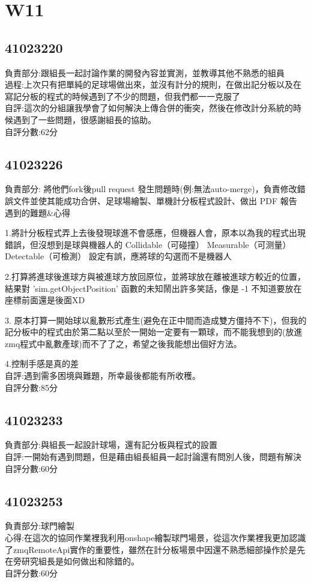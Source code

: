 \chapter{W11}


\section{41023220}

負責部分:跟組長一起討論作業的開發內容並實測，並教導其他不熟悉的組員\\過程:上次只有把單純的足球場做出來，並沒有計分的規則，在做出記分板以及在寫記分板的程式的時候遇到了不少的問題，但我們都一一克服了\\自評:這次的分組讓我學會了如何解決上傳合併的衝突，然後在修改計分系統的時候遇到了一些問題，很感謝組長的協助。\\自評分數:62分


\section{41023226}

負責部分: 將他們fork後pull request 發生問題時(例:無法auto-merge)，負責修改錯誤文件並使其能成功合併、足球場繪製、單機計分板程式設計、做出 PDF 報告\\遇到的難題&心得

1.將計分板程式弄上去後發現球進不會感應，但機器人會，原本以為我的程式出現錯誤，但沒想到是球與機器人的 Collidable（可碰撞） Measurable（可测量） Detectable（可檢測） 設定有誤，應將球的勾選而不是機器人

2.打算將進球後進球方與被進球方放回原位，並將球放在離被進球方較近的位置，結果對 'sim.getObjectPosition' 函數的未知鬧出許多笑話，像是 -1 不知道要放在座標前面還是後面XD

3. 原本打算一開始球以亂數形式產生(避免在正中間而造成雙方僵持不下)，但我的記分板中的程式由於第二點以至於一開始一定要有一顆球，而不能我想到的(放進zmq程式中亂數產球)而不了了之，希望之後我能想出個好方法。

4.控制手感是真的差\\自評:遇到需多困境與難題，所幸最後都能有所收穫。\\自評分數:85分

\section{41023233}

負責部分:與組長一起設計球場，還有記分板與程式的設置\\自評:一開始有遇到問題，但是藉由組長組員一起討論還有問別人後，問題有解決\\自評分數:60分


\section{41023253}

負責部分:球門繪製\\心得:在這次的協同作業裡我利用onshape繪製球門場景，從這次作業裡我更加認識了zmqRemoteApi實作的重要性，雖然在計分板場景中因還不熟悉細部操作於是先在旁研究組長是如何做出和除錯的。\\自評分數:60分